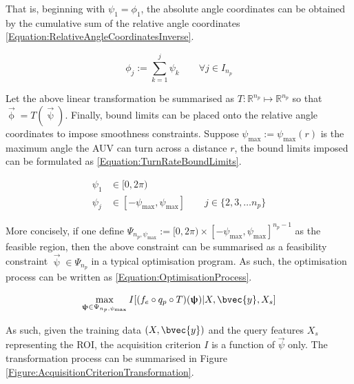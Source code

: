 			That is, beginning with $\psi_{1} = \phi_{1}$, the absolute angle coordinates can be obtained by the cumulative sum of the relative angle coordinates \eqref{Equation:RelativeAngleCoordinatesInverse}.
			
			\begin{equation}
				\phi_{j} := \sum_{k = 1}^{j} \psi_{k} \qquad \forall j \in I_{n_{p}}
			\label{Equation:RelativeAngleCoordinatesInverse}
			\end{equation}
				
			Let the above linear transformation be summarised as $T: \mathbb{R}^{n_{p}} \mapsto \mathbb{R}^{n_{p}}$ so that $\vec{\upphi} = T(\vec{\uppsi})$. Finally, bound limits can be placed onto the relative angle coordinates to impose smoothness constraints. Suppose $\psi_{\mathrm{max}} := \psi_{\mathrm{max}}(r)$ is the maximum angle the AUV can turn across a distance $r$, the bound limits imposed can be formulated as \eqref{Equation:TurnRateBoundLimits}.

			\begin{equation}
				\begin{aligned}
					\psi_{1} & \in [0, 2 \pi) \\
					\psi_{j} & \in [-\psi_{\mathrm{max}}, \psi_{\mathrm{max}}] \qquad j \in \{2, 3, \dots n_{p}\}
				\end{aligned}
			\label{Equation:TurnRateBoundLimits}
			\end{equation}
			
			More concisely, if one define $\Psi_{n_{p}, \psi_{\mathrm{max}}} := [0, 2 \pi) \times [-\psi_{\mathrm{max}}, \psi_{\mathrm{max}}]^{n_{p} - 1}$ as the feasible region, then the above constraint can be summarised as a feasibility constraint $\vec{\uppsi} \in \Psi_{n_{p}}$ in a typical optimisation program. As such, the optimisation process can be written as \eqref{Equation:OptimisationProcess}.
			
			\begin{equation}
				\max_{\vec{\uppsi} \in \Psi_{n_{p}, \psi_{\mathrm{max}}}} I[(f_{e} \circ q_{p} \circ T)(\vec{\uppsi}) | X, \bvec{y}, X_{s}]				
			\label{Equation:OptimisationProcess}
			\end{equation}
		
			As such, given the training data $(X, \bvec{y})$ and the query features $X_{s}$ representing the ROI, the acquisition criterion $I$ is a function of $\vec{\psi}$ only. The transformation process can be summarised in Figure \ref{Figure:AcquisitionCriterionTransformation}.
			
